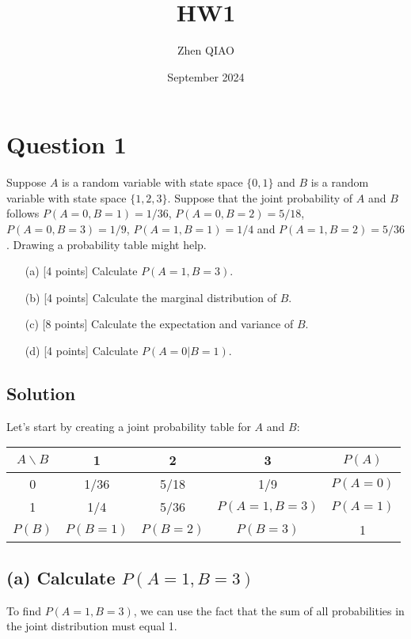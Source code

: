 \documentclass{article}
\title{HW1}
\author{Zhen QIAO}
\date{September 2024}
\begin{document}
\maketitle
\section*{Question 1}

Suppose $A$ is a random variable with state space $\{0, 1\}$ and $B$ is a random variable with state space $\{1, 2, 3\}$. Suppose that the joint probability of $A$ and $B$ follows $P(A = 0, B = 1) = 1/36$, $P(A = 0, B = 2) = 5/18$, $P(A = 0, B = 3) = 1/9$, $P(A = 1, B = 1) = 1/4$ and $P(A = 1, B = 2) = 5/36$. Drawing a probability table might help.

\begin{enumerate}
    \item[(a)] [4 points] Calculate $P(A = 1, B = 3)$.
    \item[(b)] [4 points] Calculate the marginal distribution of $B$.
    \item[(c)] [8 points] Calculate the expectation and variance of $B$.
    \item[(d)] [4 points] Calculate $P(A = 0|B = 1)$.
\end{enumerate}

\subsection*{Solution}

Let's start by creating a joint probability table for $A$ and $B$:

\begin{table}[h]
\centering
\begin{tabular}{c|ccc|c}
$A \backslash B$ & 1 & 2 & 3 & $P(A)$ \\
\hline
0 & 1/36 & 5/18 & 1/9 & $P(A=0)$ \\
1 & 1/4 & 5/36 & $P(A=1,B=3)$ & $P(A=1)$ \\
\hline
$P(B)$ & $P(B=1)$ & $P(B=2)$ & $P(B=3)$ & 1
\end{tabular}
\end{table}

\subsection*{(a) Calculate $P(A = 1, B = 3)$}

To find $P(A = 1, B = 3)$, we can use the fact that the sum of all probabilities in the joint distribution must equal 1.
\end{document}
